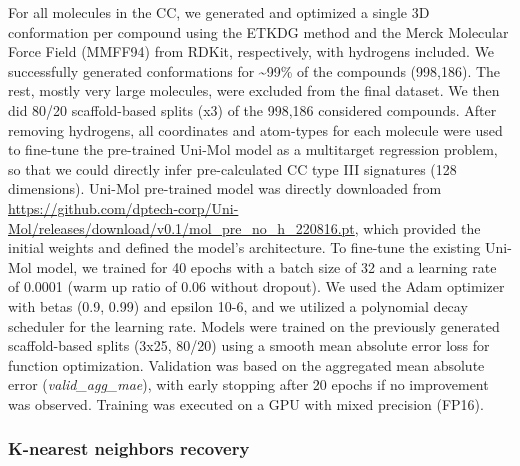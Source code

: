 For all molecules in the CC, we generated and optimized a single 3D conformation per compound using the ETKDG method\cite{riniker_better_2015} and the Merck Molecular Force Field (MMFF94) from RDKit, respectively, with hydrogens included. We successfully generated conformations for \textasciitilde99\% of the compounds (998,186). The rest, mostly very large molecules, were excluded from the final dataset. We then did 80/20 scaffold-based splits (x3) of the 998,186 considered compounds.
After removing hydrogens, all coordinates and atom-types for each molecule were used to fine-tune the pre-trained Uni-Mol model as a multitarget regression problem, so that we could directly infer pre-calculated CC type III signatures (128 dimensions). Uni-Mol pre-trained model was directly downloaded from \href{https://github.com/dptech-corp/Uni-Mol/releases/download/v0.1/mol_pre_no_h_220816.pt}{https://github.com/dptech-corp/Uni-Mol/releases/download/v0.1/mol\_pre\_no\_h\_220816.pt}, which provided the initial weights and defined the model’s architecture. To fine-tune the existing Uni-Mol model, we trained for 40 epochs with a batch size of 32 and a learning rate of 0.0001 (warm up ratio of 0.06 without dropout). We used the Adam optimizer with betas (0.9, 0.99) and epsilon 10-6, and we utilized a polynomial decay scheduler for the learning rate. Models were trained on the previously generated scaffold-based splits (3x25, 80/20) using a smooth mean absolute error loss for function optimization. Validation was based on the aggregated mean absolute error (\textit{valid\_agg\_mae}), with early stopping after 20 epochs if no improvement was observed. Training was executed on a GPU with mixed precision (FP16). 

\subsubsection{K-nearest neighbors recovery}


